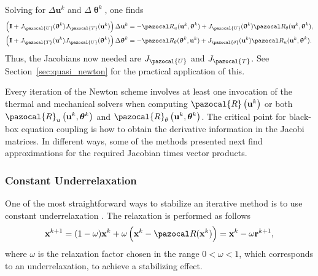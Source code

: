 Solving for \(\Delta \mathbf u^k\) and \(\Delta \bm \uptheta^k\), one finds
\begin{align}
  \left(\mathbf I + J_\pazocal{U}(\bm\uptheta^k)J_\pazocal{T}(\mathbf u^k)\right)\Delta \mathbf u^k &= - \pazocal R_u(\mathbf u^k, \bm \uptheta^k)+J_\pazocal{U}(\bm\uptheta^k)\pazocal R_\theta(\mathbf u^k, \bm\uptheta^k), \label{eq:explicit_eq_delta_u_newton}\\
  \left(\mathbf I + J_\pazocal{T}(\mathbf u^k)J_\pazocal{U}(\bm\uptheta^k)\right)\Delta \bm\uptheta^k &= - \pazocal R_\theta(\bm \uptheta^k, \mathbf u^k)+J_\pazocal{\theta}(\mathbf u^k)\pazocal R_u(\mathbf u^k, \bm\uptheta^k). \label{eq:explicit_eq_delta_theta_newton}
\end{align}
Thus, the Jacobians now needed are \(J_\pazocal{U}\) and \(J_\pazocal{T}\).
See Section~\ref{sec:quasi_newton} for the practical application of this.

Every iteration of the Newton scheme involves at least one invocation of the thermal and mechanical solvers when computing $\pazocal{R}\left(\mathbf{u}^{k}\right)$ or both $\pazocal{R}_{u}\left(\mathbf{u}^{k}, \boldsymbol{\theta}^{k}\right)$ and $\pazocal{R}_{\theta}\left(\mathbf{u}^{k}, \boldsymbol{\theta}^{k}\right)$.
The critical point for black-box equation coupling is how to obtain the derivative information in the Jacobi matrices.
In different ways, some of the methods presented next find approximations for the required Jacobian times vector products.



\subsubsection{Constant Underrelaxation}

One of the most straightforward ways to stabilize an iterative method is to use constant underrelaxation \citep{gatzhammer_efficient_2014}.
The relaxation is performed as follows
\begin{equation} \label{eq:constant_relaxation}
\mathbf x^{k+1}=(1-\omega) \mathbf x^{k}+\omega\left(\mathbf x^k - \pazocal R(\mathbf x^k)\right)=\mathbf x^{k} -\omega \mathbf{r}^{k+1},
\end{equation}
where \(\omega\) is the relaxation factor chosen in the range \(0<\omega<1\), which corresponds to an underrelaxation, to achieve a stabilizing effect.

